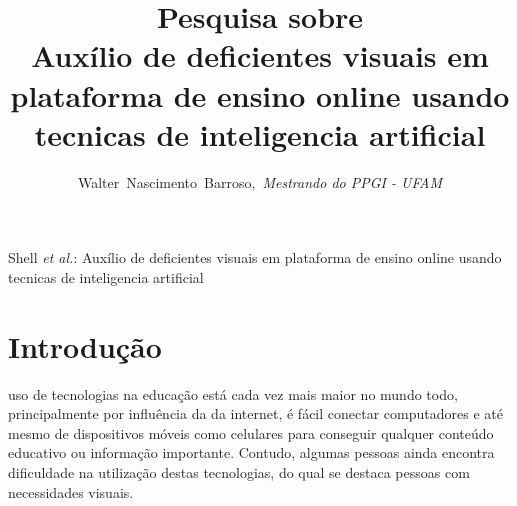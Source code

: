 \documentclass[12pt,journal,compsoc]{IEEEtran}
\begin{document}
\title{Pesquisa sobre\\ Auxílio de deficientes visuais em plataforma de ensino online usando tecnicas de inteligencia artificial}

\author{
	Walter~Nascimento~Barroso,\textit{~Mestrando do PPGI - UFAM}%
	
}

%
{Shell \MakeLowercase{\textit{et al.}}: Auxílio de deficientes visuais em plataforma de ensino online usando tecnicas de inteligencia artificial}



\maketitle
\IEEEdisplaynontitleabstractindextext
\IEEEpeerreviewmaketitle


\ifCLASSOPTIONcompsoc
{}
\else	
\section{Introdução}
\label{sec:introducao}
\fi

 uso de tecnologias na educação está cada vez mais maior no mundo todo, principalmente por influência da da internet, 
é fácil conectar computadores e até mesmo de dispositivos móveis como celulares para  conseguir qualquer conteúdo educativo ou 
informação importante. Contudo, algumas pessoas ainda encontra dificuldade na utilização destas tecnologias, do qual se destaca 
pessoas com necessidades visuais.
\end{document}
